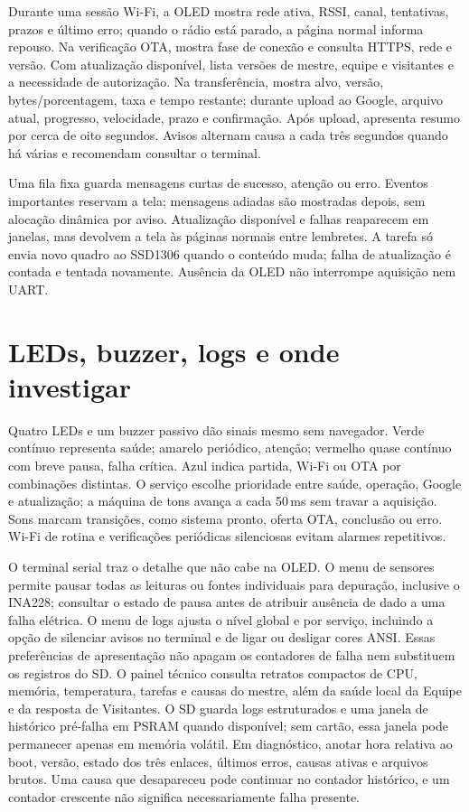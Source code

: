 Durante uma sessão Wi-Fi, a OLED mostra rede ativa, RSSI, canal, tentativas, prazos e último erro; quando o rádio está parado, a página normal informa repouso. Na verificação OTA, mostra fase de conexão e consulta HTTPS, rede e versão. Com atualização disponível, lista versões de mestre, equipe e visitantes e a necessidade de autorização. Na transferência, mostra alvo, versão, bytes/porcentagem, taxa e tempo restante; durante upload ao Google, arquivo atual, progresso, velocidade, prazo e confirmação. Após upload, apresenta resumo por cerca de oito segundos. Avisos alternam causa a cada três segundos quando há várias e recomendam consultar o terminal.

Uma fila fixa guarda mensagens curtas de sucesso, atenção ou erro. Eventos importantes reservam a tela; mensagens adiadas são mostradas depois, sem alocação dinâmica por aviso. Atualização disponível e falhas reaparecem em janelas, mas devolvem a tela às páginas normais entre lembretes. A tarefa só envia novo quadro ao SSD1306 quando o conteúdo muda; falha de atualização é contada e tentada novamente. Ausência da OLED não interrompe aquisição nem UART.

\section{LEDs, buzzer, logs e onde investigar}
Quatro LEDs e um buzzer passivo dão sinais mesmo sem navegador. Verde contínuo representa saúde; amarelo periódico, atenção; vermelho quase contínuo com breve pausa, falha crítica. Azul indica partida, Wi-Fi ou OTA por combinações distintas. O serviço escolhe prioridade entre saúde, operação, Google e atualização; a máquina de tons avança a cada 50\,ms sem travar a aquisição. Sons marcam transições, como sistema pronto, oferta OTA, conclusão ou erro. Wi-Fi de rotina e verificações periódicas silenciosas evitam alarmes repetitivos.

O terminal serial traz o detalhe que não cabe na OLED. O menu de sensores permite pausar todas as leituras ou fontes individuais para depuração, inclusive o INA228; consultar o estado de pausa antes de atribuir ausência de dado a uma falha elétrica. O menu de logs ajusta o nível global e por serviço, incluindo a opção de silenciar avisos no terminal e de ligar ou desligar cores ANSI. Essas preferências de apresentação não apagam os contadores de falha nem substituem os registros do SD. O painel técnico consulta retratos compactos de CPU, memória, temperatura, tarefas e causas do mestre, além da saúde local da Equipe e da resposta de Visitantes. O SD guarda logs estruturados e uma janela de histórico pré-falha em PSRAM quando disponível; sem cartão, essa janela pode permanecer apenas em memória volátil. Em diagnóstico, anotar hora relativa ao boot, versão, estado dos três enlaces, últimos erros, causas ativas e arquivos brutos. Uma causa que desapareceu pode continuar no contador histórico, e um contador crescente não significa necessariamente falha presente.

